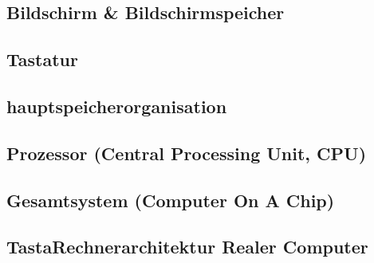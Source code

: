 \documentclass[12pt]{report}
\begin{document}
\subsection{Bildschirm \& Bildschirmspeicher}
\subsection{Tastatur}
\subsection{hauptspeicherorganisation}
\subsection{Prozessor (Central Processing Unit, CPU)}
\subsection{Gesamtsystem (Computer On A Chip)}
\subsection{TastaRechnerarchitektur Realer Computer}





\end{document}
